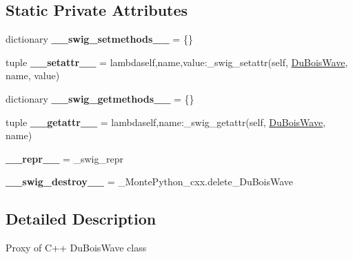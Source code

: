 \subsection*{Static Private Attributes}
\begin{DoxyCompactItemize}
\item 
\hypertarget{classMontePython__cxx_1_1DuBoisWave_a7d6fb9dfe2f1da070d6447f999d2533a}{}dictionary {\bfseries \+\_\+\+\_\+swig\+\_\+setmethods\+\_\+\+\_\+} = \{\}\label{classMontePython__cxx_1_1DuBoisWave_a7d6fb9dfe2f1da070d6447f999d2533a}

\item 
\hypertarget{classMontePython__cxx_1_1DuBoisWave_a2f1d1f3ab2ea3add6915de83c41d34d5}{}tuple {\bfseries \+\_\+\+\_\+setattr\+\_\+\+\_\+} = lambdaself,name,value\+:\+\_\+swig\+\_\+setattr(self, \hyperlink{classMontePython__cxx_1_1DuBoisWave}{Du\+Bois\+Wave}, name, value)\label{classMontePython__cxx_1_1DuBoisWave_a2f1d1f3ab2ea3add6915de83c41d34d5}

\item 
\hypertarget{classMontePython__cxx_1_1DuBoisWave_a2ff16ff62f8f554cff1c97670bd02d6d}{}dictionary {\bfseries \+\_\+\+\_\+swig\+\_\+getmethods\+\_\+\+\_\+} = \{\}\label{classMontePython__cxx_1_1DuBoisWave_a2ff16ff62f8f554cff1c97670bd02d6d}

\item 
\hypertarget{classMontePython__cxx_1_1DuBoisWave_ac641e8db1a1acd606852ed6555a77eb5}{}tuple {\bfseries \+\_\+\+\_\+getattr\+\_\+\+\_\+} = lambdaself,name\+:\+\_\+swig\+\_\+getattr(self, \hyperlink{classMontePython__cxx_1_1DuBoisWave}{Du\+Bois\+Wave}, name)\label{classMontePython__cxx_1_1DuBoisWave_ac641e8db1a1acd606852ed6555a77eb5}

\item 
\hypertarget{classMontePython__cxx_1_1DuBoisWave_a9e0d5521e7c38b109dfd882907dc6461}{}{\bfseries \+\_\+\+\_\+repr\+\_\+\+\_\+} = \+\_\+swig\+\_\+repr\label{classMontePython__cxx_1_1DuBoisWave_a9e0d5521e7c38b109dfd882907dc6461}

\item 
\hypertarget{classMontePython__cxx_1_1DuBoisWave_a32e5a094fb95974ec7ea76f18872dd96}{}{\bfseries \+\_\+\+\_\+swig\+\_\+destroy\+\_\+\+\_\+} = \+\_\+\+Monte\+Python\+\_\+cxx.\+delete\+\_\+\+Du\+Bois\+Wave\label{classMontePython__cxx_1_1DuBoisWave_a32e5a094fb95974ec7ea76f18872dd96}

\end{DoxyCompactItemize}


\subsection{Detailed Description}
\begin{DoxyVerb}Proxy of C++ DuBoisWave class\end{DoxyVerb}
 

